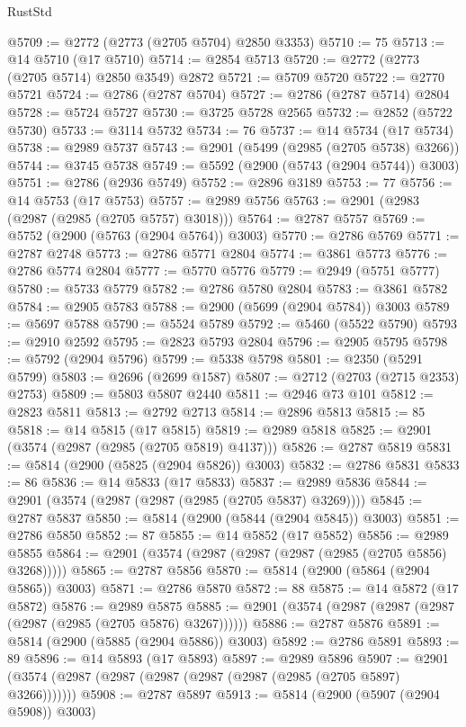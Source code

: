 \begin{lexlean}{RustStd}
\begin{coremodule}
@5709 := @2772 (@2773 (@2705 @5704) @2850 @3353)
@5710 := 75
@5713 := @14 @5710 (@17 @5710)
@5714 := @2854 @5713
@5720 := @2772 (@2773 (@2705 @5714) @2850 @3549) @2872
@5721 := @5709 @5720
@5722 := @2770 @5721
@5724 := @2786 (@2787 @5704)
@5727 := @2786 (@2787 @5714) @2804
@5728 := @5724 @5727
@5730 := @3725 @5728 @2565
@5732 := @2852 (@5722 @5730)
@5733 := @3114 @5732
@5734 := 76
@5737 := @14 @5734 (@17 @5734)
@5738 := @2989 @5737
@5743 := @2901 (@5499 (@2985 (@2705 @5738) @3266))
@5744 := @3745 @5738
@5749 := @5592 (@2900 (@5743 (@2904 @5744)) @3003)
@5751 := @2786 (@2936 @5749)
@5752 := @2896 @3189
@5753 := 77
@5756 := @14 @5753 (@17 @5753)
@5757 := @2989 @5756
@5763 := @2901 (@2983 (@2987 (@2985 (@2705 @5757) @3018)))
@5764 := @2787 @5757
@5769 := @5752 (@2900 (@5763 (@2904 @5764)) @3003)
@5770 := @2786 @5769
@5771 := @2787 @2748
@5773 := @2786 @5771 @2804
@5774 := @3861 @5773
@5776 := @2786 @5774 @2804
@5777 := @5770 @5776
@5779 := @2949 (@5751 @5777)
@5780 := @5733 @5779
@5782 := @2786 @5780 @2804
@5783 := @3861 @5782
@5784 := @2905 @5783
@5788 := @2900 (@5699 (@2904 @5784)) @3003
@5789 := @5697 @5788
@5790 := @5524 @5789
@5792 := @5460 (@5522 @5790)
@5793 := @2910 @2592
@5795 := @2823 @5793 @2804
@5796 := @2905 @5795
@5798 := @5792 (@2904 @5796)
@5799 := @5338 @5798
@5801 := @2350 (@5291 @5799)
@5803 := @2696 (@2699 @1587)
@5807 := @2712 (@2703 (@2715 @2353) @2753)
@5809 := @5803 @5807 @2440
@5811 := @2946 @73 @101
@5812 := @2823 @5811
@5813 := @2792 @2713
@5814 := @2896 @5813
@5815 := 85
@5818 := @14 @5815 (@17 @5815)
@5819 := @2989 @5818
@5825 := @2901 (@3574 (@2987 (@2985 (@2705 @5819) @4137)))
@5826 := @2787 @5819
@5831 := @5814 (@2900 (@5825 (@2904 @5826)) @3003)
@5832 := @2786 @5831
@5833 := 86
@5836 := @14 @5833 (@17 @5833)
@5837 := @2989 @5836
@5844 := @2901 (@3574 (@2987 (@2987 (@2985 (@2705 @5837) @3269))))
@5845 := @2787 @5837
@5850 := @5814 (@2900 (@5844 (@2904 @5845)) @3003)
@5851 := @2786 @5850
@5852 := 87
@5855 := @14 @5852 (@17 @5852)
@5856 := @2989 @5855
@5864 := @2901 (@3574 (@2987 (@2987 (@2987 (@2985 (@2705 @5856) @3268)))))
@5865 := @2787 @5856
@5870 := @5814 (@2900 (@5864 (@2904 @5865)) @3003)
@5871 := @2786 @5870
@5872 := 88
@5875 := @14 @5872 (@17 @5872)
@5876 := @2989 @5875
@5885 := @2901 (@3574 (@2987 (@2987 (@2987 (@2987 (@2985 (@2705 @5876) @3267))))))
@5886 := @2787 @5876
@5891 := @5814 (@2900 (@5885 (@2904 @5886)) @3003)
@5892 := @2786 @5891
@5893 := 89
@5896 := @14 @5893 (@17 @5893)
@5897 := @2989 @5896
@5907 := @2901 (@3574 (@2987 (@2987 (@2987 (@2987 (@2987 (@2985 (@2705 @5897) @3266)))))))
@5908 := @2787 @5897
@5913 := @5814 (@2900 (@5907 (@2904 @5908)) @3003)

\end{coremodule}
\end{lexlean}

